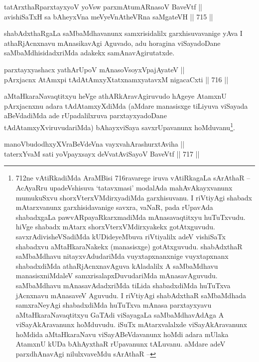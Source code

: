 \begin{shl}
tatArxthaRparxtayxyoV yoV\s sw parxmAtumARnasoV BaveVtf || \\
avishiSaTxH sa bAheyxVna meVyeVnAtheVRna saMgateVH \hfill || 715 ||  
\end{shl}

\begin{artha} 
shabAdxthaRgaLa saMbaMdhavanunx samxrisidalilx garxhisuvavanige yAva I 
athaRjAcnxnavu mAnasikavAgi Aguvado, adu horagina viSayadoDane 
saMbaMdhisidadxriMda adakekx samAnavAgirutatxde.
\end{artha}

\begin{shl}
parxtayxyashacx yathArUpoV mAnasoV\s soyxVpajAyateV || \\
pArxjacnx AtAmx\s pi tAdAtAmxyXtatxnamxyatavxM nigacaCxti \hfill || 716 ||  
\end{shl}

\begin{artha} 
aMtaHkaraNavaqtitxyu heVge athARkAravAgiruvudo hAgeye AtamxnU 
pArxjacnxnu adara tAdAtamxyXdiMda (aMdare manasisxge tiLiyuva viSayada 
aBeVdadiMda ade rUpadalilxruva parxtayxyadoDane 
tAdAtamxyXviruvudariMda) bAhayxviSaya savxrUpavanunx 
hoMduvanu\footnote{712ne vAtiRkadiMda AraMBisi 716ravarege iruva 
vAtiRkagaLa sArAthaR {\rm --} AcAyaRru upadeVshisuva `tatavxmasi' modalAda 
mahAvAkayxvanunx mumukuSxvu shorxVterxVMdirxyadiMda garxhisuvanu. I 
riVtiyAgi shabadx mAtarxvanunx garxhisidavanige savxra, vaNaR, pada 
rUpavAda shabadxgaLa pawvARpayaRkarxmadiMda mAnasavaqtitxyu 
huTuTxvudu. hiVge shabadx mAtarx shorxVterxVMdirxyakekx gotAtxguvudu. 
savxrAdivisheVSadiMda kUDideyeMbuva riVtiyalilx adeV vishiSaTx 
shabadxvu aMtaHkaraNakekx (manasisxge) gotAtxguvudu. shabAdxthaR 
saMbaMdhavu nitayxvAdudariMda vuyxtapxnanxnige vuyxtapxnanx 
shabadxdiMda athaRjAcnxnavAguva kAladalilx A saMbaMdhavu 
manasisxniMdaleV samxrisalapxDuvudariMda mAnasavAguvudu. saMbaMdhavu 
mAnasavAdadxriMda tiLida shabadxdiMda huTuTxva jAcnxnavu mAnasaveV 
Aguvudu. I riVtiyAgi shabAdxthaR saMbaMdhada samxraNeyAgi shabadxdiMda 
huTuTxva mAnasa parxtayxyavu aMtaHkaraNavaqtitxyu GaTAdi viSayagaLa 
saMbaMdhavAdAga A viSayAkAravanunx hoMduvudu. iSuTx mAtarxvalalxde 
viSayAkAravanunx hoMdida aMtaHkaraNavu viSayABeVdavanunx hoMdi adara 
mUlaka AtamxnU kUDa bAhAyxthaR rUpavanunx tALuvanu. aMdare adeV 
parxdhAnavAgi nilulxvaveMdu sArAthaR {\rm --}}.
\end{artha}

\begin{shl}
manoVbudodhxyXVraBeVdeVna vayxvahArashurxtAviha || \\
taterxYvaM sati yoVpayxsayx deVvatAviSayoV BaveVtf \hfill || 717 ||  
\end{shl}
				
